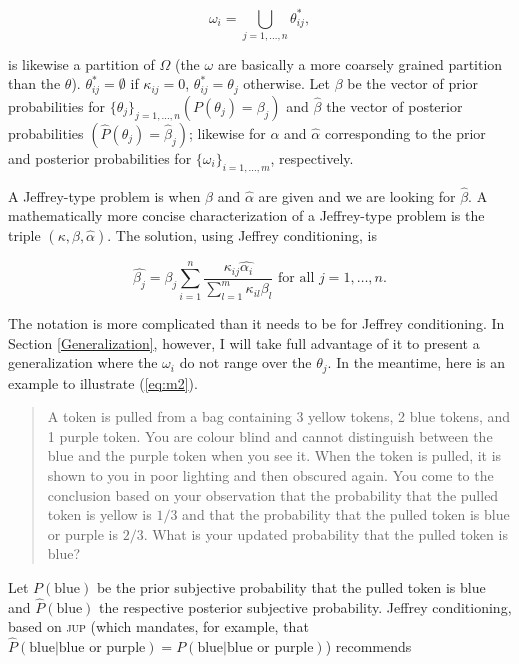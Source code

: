 \documentclass[entropy,article,submit,oneauthor,pdftex,12pt,a4paper]{mdpi}
\newenvironment{quotex}{\begin{quote}\begin{footnotesize}}{\end{footnotesize}\end{quote}}
\begin{document}
\begin{equation}
  \label{eq:m1}
  \omega_{i}=\bigcup_{j=1,\dots,n}\theta^{*}_{ij},
\end{equation}

{\noindent}is likewise a partition of $\Omega$ (the $\omega$ are
basically a more coarsely grained partition than the $\theta$).
$\theta^{*}_{ij}=\emptyset$ if $\kappa_{ij}=0$,
$\theta^{*}_{ij}=\theta_{j}$ otherwise. Let $\beta$ be the vector of
prior probabilities for $\{\theta_{j}\}_{j=1,\ldots,n}
(P(\theta_{j})=\beta_{j})$ and $\hat{\beta}$ the vector of posterior
probabilities $(\hat{P}(\theta_{j})=\hat{\beta}_{j})$; likewise for
$\alpha$ and $\hat{\alpha}$ corresponding to the prior and posterior
probabilities for $\{\omega_{i}\}_{i=1,\ldots,m}$, respectively.

A Jeffrey-type problem is when $\beta$ and $\hat{\alpha}$ are given
and we are looking for $\hat{\beta}$. A mathematically more concise
characterization of a Jeffrey-type problem is the triple
$(\kappa,\beta,\hat{\alpha})$. The solution, using Jeffrey
conditioning, is

\begin{equation}
  \label{eq:m2}
  \hat{\beta_{j}}=\beta_{j}\sum_{i=1}^{n}\frac{\kappa_{ij}\hat{\alpha_{i}}}{\sum_{l=1}^{m}\kappa_{il}\beta_{l}}\mbox{ for all }j=1,\ldots,n.
\end{equation}

{\noindent}The notation is more complicated than it needs to be for Jeffrey
conditioning. In Section \ref{Generalization}, however, I will take
full advantage of it to present a generalization where the
$\omega_{i}$ do not range over the $\theta_{j}$. In the meantime, here
is an example to illustrate (\ref{eq:m2}).

\begin{quotex}
  A token is pulled from a bag containing 3 yellow tokens, 2 blue
  tokens, and 1 purple token. You are colour blind and cannot
  distinguish between the blue and the purple token when you see it.
  When the token is pulled, it is shown to you in poor lighting and
  then obscured again. You come to the conclusion based on your
  observation that the probability that the pulled token is yellow is
  $1/3$ and that the probability that the pulled token is blue or
  purple is $2/3$. What is your updated probability that the pulled
  token is blue?
\end{quotex}

{\noindent}Let $P(\mbox{blue})$ be the prior subjective probability that the
pulled token is blue and $\hat{P}(\mbox{blue})$ the respective posterior
subjective probability. Jeffrey conditioning, based on \textsc{jup}
(which mandates, for example, that $\hat{P}(\mbox{blue}|\mbox{blue or
  purple})=P(\mbox{blue}|\mbox{blue or purple})$) recommends
\end{document}
